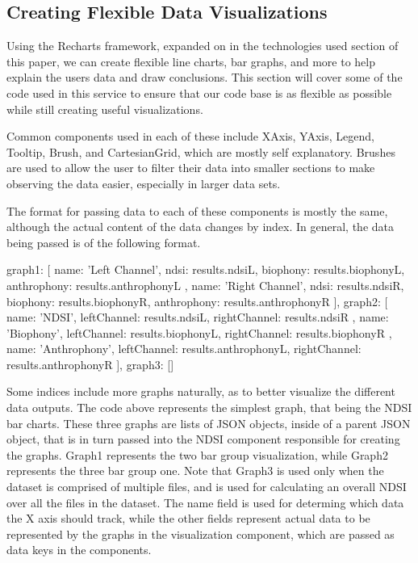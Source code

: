 \subsection{Creating Flexible Data Visualizations}
Using the Recharts framework, expanded on in the technologies used section of this paper, we can create flexible line charts, bar graphs, and more to help explain the user\textquotesingle s data and draw conclusions. This section will cover some of the code used in this service to ensure that our code base is as flexible as possible while still creating useful visualizations.\par
Common components used in each of these include XAxis, YAxis, Legend, Tooltip, Brush, and CartesianGrid, which are mostly self explanatory. Brushes are used to allow the user to filter their data into smaller sections to make observing the data easier, especially in larger data sets.\par
The format for passing data to each of these components is mostly the same, although the actual content of the data changes by index. In general, the data being passed is of the following format.\par

\begin{javascriptcode}
{
  graph1: [
            {
              name: 'Left Channel',
              ndsi: results.ndsiL,
              biophony: results.biophonyL,
              anthrophony: results.anthrophonyL
            },
            {
              name: 'Right Channel',
              ndsi: results.ndsiR,
              biophony: results.biophonyR,
              anthrophony: results.anthrophonyR
            }
          ],
  graph2: [
            {
              name: 'NDSI',
              leftChannel: results.ndsiL,
              rightChannel: results.ndsiR
            },
            {
              name: 'Biophony',
              leftChannel: results.biophonyL,
              rightChannel: results.biophonyR
            },
            {
              name: 'Anthrophony',
              leftChannel: results.anthrophonyL,
              rightChannel: results.anthrophonyR
            }
          ],
  graph3: []
}
\end{javascriptcode}

Some indices include more graphs naturally, as to better visualize the different data outputs. The code above represents the simplest graph, that being the NDSI bar charts. These three graphs are lists of JSON objects, inside of a parent JSON object, that is in turn passed into the NDSI component responsible for creating the graphs. Graph1 represents the two bar group visualization, while Graph2 represents the three bar group one. Note that Graph3 is used only when the dataset is comprised of multiple files, and is used for calculating an overall NDSI over all the files in the dataset. The name field is used for determing which data the X axis should track, while the other fields represent actual data to be represented by the graphs in the visualization component, which are passed as data keys in the components.






